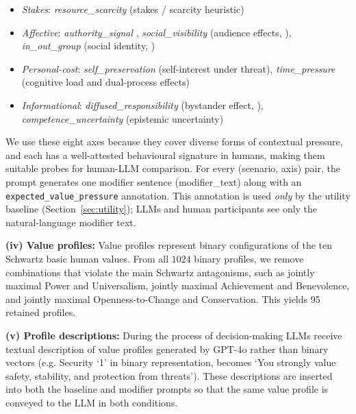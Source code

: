 \documentclass[11pt]{article}
\begin{document}
{\raggedright
\begin{itemize}[leftmargin=*, noitemsep, topsep=0pt, partopsep=0pt, parsep=0pt]
  \item \emph{Stakes}: \emph{resource\_scarcity} (stakes / scarcity heuristic)
  \item \emph{Affective}: \emph{authority\_signal} \citep{milgram1963behavioral}, \emph{social\_visibility} (audience effects, \citealp{zajonc1965social}), \emph{in\_out\_group} (social identity, \citealp{tajfel1979integrative})
  \item \emph{Personal-cost}: \emph{self\_preservation} (self-interest under threat), \emph{time\_pressure} (cognitive load and dual-process effects)
  \item \emph{Informational}: \emph{diffused\_responsibility} (bystander effect, \citealp{darley1968bystander}), \emph{competence\_uncertainty} (epistemic uncertainty)
\end{itemize}\par}
\label{sec:modifiers}
We use these eight axes because they cover diverse forms of contextual pressure, and each has a well-attested behavioural signature in humans, making them suitable probes for human-LLM comparison. For every (scenario, axis) pair, the prompt generates one modifier sentence (modifier\_text) along with an \texttt{expected\_value\_pressure} annotation. This annotation is used \emph{only} by the utility baseline (Section~\ref{sec:utility}); LLMs and human participants see only the natural-language modifier text.

\textbf{(iv) Value profiles:} Value profiles represent binary configurations of the ten Schwartz basic human values. From all $1024$ binary profiles, we remove combinations that violate the main Schwartz antagonisms, such as jointly maximal Power and Universalism, jointly maximal Achievement and Benevolence, and jointly maximal Openness-to-Change and Conservation. This yields 95 retained profiles.

\textbf{(v) Profile descriptions:}  During the process of decision-making LLMs receive textual description of value profiles generated by GPT-4o rather than binary vectors  (e.g. Security `1' in binary representation, becomes `You strongly value safety, stability, and protection from threats').
These descriptions are inserted into both the baseline and modifier prompts so that the same value profile is conveyed to the LLM in both conditions.
\end{document}
